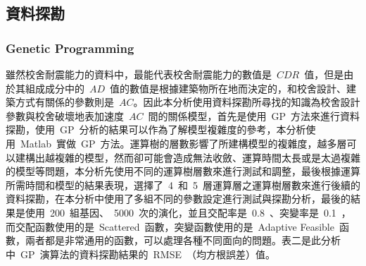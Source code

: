 \subsection{資料探勘}

\subsubsection{Genetic Programming}

雖然校舍耐震能力的資料中，最能代表校舍耐震能力的數值是~$CDR$~值，但是由於其組成成分中的~$AD$~值的數值是根據建築物所在地而決定的，和校舍設計、建築方式有關係的參數則是~$AC$。因此本分析使用資料探勘所尋找的知識為校舍設計參數與校舍破壞地表加速度~$AC$~間的關係模型，首先是使用~GP~方法來進行資料探勘，使用~GP~分析的結果可以作為了解模型複雜度的參考，本分析使用~Matlab\cite{matlab}~實做~GP~方法。運算樹的層數影響了所建構模型的複雜度，越多層可以建構出越複雜的模型，然而卻可能會造成無法收斂、運算時間太長或是太過複雜的模型等問題，本分析先使用不同的運算樹層數來進行測試和調整，最後根據運算所需時間和模型的結果表現，選擇了~4~和~5~層運算層之運算樹層數來進行後續的資料探勘，在本分析中使用了多組不同的參數設定進行測試與探勘分析，最後的結果是使用~200~組基因、~5000~次的演化，並且交配率是~0.8~、突變率是~0.1~，而交配函數使用的是~Scattered~函數，突變函數使用的是~Adaptive Feasible~函數，兩者都是非常通用的函數，可以處理各種不同面向的問題。表二是此分析中~GP~演算法的資料探勘結果的~RMSE~（均方根誤差）值。


